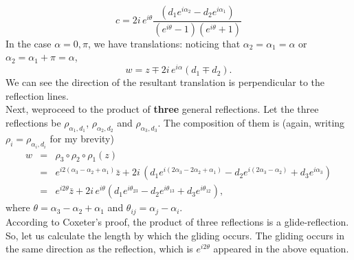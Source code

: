 \documentclass{article}
\begin{document}
\begin{equation}
c =  2i \, e^{i\theta}\frac{( d_{1} e^{i\alpha_{2}} - d_{2} e^{i\alpha_{1}}) }{(e^{i\theta} - 1)(e^{i\theta} + 1)} \nonumber 
\end{equation}
In the case $\alpha = 0, \pi$, we have translations: noticing that $\alpha_{2} = \alpha_{1} = \alpha$ or $\alpha_{2} = \alpha_{1} + \pi = \alpha$,
\begin{equation}
w = z \mp 2i \, e^{i\alpha}( d_{1} \mp d_{2}).
\end{equation}
We can see the direction of the resultant translation is perpendicular to the reflection lines.\\
Next, weproceed to the product of \textbf{three} general reflections. Let the three reflections be $\rho_{\alpha_{1}, d_{1}}$, $\rho_{\alpha_{2},d_{2}}$ and $\rho_{\alpha_{3},d_{3}}$.
The composition of them is (again, writing $\rho_{i} = \rho_{\alpha_{i}, d_{i}}$ for my brevity)
\begin{eqnarray}
w &=& \rho_{3} \circ \rho_{2} \circ \rho_{1} (z) \nonumber \\
  &=& e^{i2(\alpha_{3} - \alpha_{2} + \alpha_{1})} \bar{z} + 2i \, ( d_{1} e^{i(2\alpha_{3} - 2\alpha_{2} + \alpha_{1})} - d_{2} e^{i(2\alpha_{3} - \alpha_{2})} + d_{3} e^{i\alpha_{3}})  \nonumber \\
  &=& e^{i2\theta} \bar{z} + 2i \, e^{i\theta}( d_{1} e^{i\theta_{23}} - d_{2} e^{i\theta_{13}} + d_{3} e^{i\theta_{12}}),
\end{eqnarray}
where $\theta = \alpha_{3} - \alpha_{2} + \alpha_{1}$ and $\theta_{ij} = \alpha_{j} - \alpha_{i}$.\\
According to Coxeter's proof, the product of three reflections is a glide-reflection. So, let us calculate the length by which the gliding occurs.
The gliding occurs in the same direction as the reflection, which is $e^{i2\theta}$ appeared in the above equation.
\end{document}
